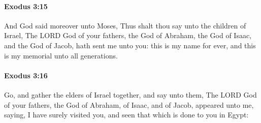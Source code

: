 		\paragraph{Exodus 3:15} %
			\label{EXODUS-3-15}

			And God said moreover unto Moses, Thus shalt thou say unto the children of Israel, The LORD God of your fathers, the God of Abraham, the God of Isaac, and the God of Jacob, hath sent me unto you: this is my name for ever, and this is my memorial unto all generations.


		\paragraph{Exodus 3:16} %
			\label{EXODUS-3-16}

			Go, and gather the elders of Israel together, and say unto them, The LORD God of your fathers, the God of Abraham, of Isaac, and of Jacob, appeared unto me, saying, I have surely visited you, and seen that which is done to you in Egypt:


